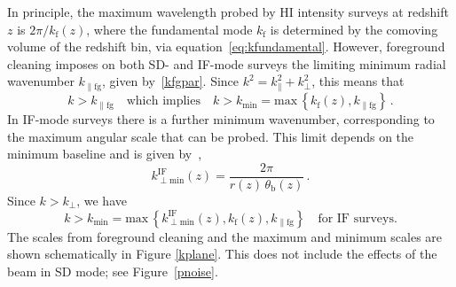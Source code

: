 In principle, the maximum wavelength probed by HI intensity surveys at redshift $z$ is $2\pi/k_\mathrm{f}(z)$, where the fundamental mode $k_\mathrm{f}$ is determined by the comoving volume of the redshift bin, via equation~\ref{eq:kfundamental}. 
However, foreground cleaning imposes on both SD- and IF-mode surveys the  limiting minimum radial wavenumber $k_{\|\mathrm{fg}}$, given by~\eqref{kfgpar}. Since $k^2=k_\|^2+k_\perp^2$, this means that  
\begin{equation} \label{eq:kmin}
k>k_{\|\mathrm{fg}} \quad \mbox{which implies}\quad k >  k_\mathrm{min}= \mathrm{max}\,\left\{ k_\mathrm{f}(z), k_{\|\mathrm{fg}} \right\}\,.
\end{equation}
In IF-mode surveys there is a further minimum wavenumber, corresponding to the maximum angular scale that can be probed. This limit depends on the minimum baseline and is given by~\cite{Bull:2014rha,Alonso:2017dgh,Karagiannis:2019jjx,Durrer:2020orn},
\begin{equation} \label{kifmin}
k_{\perp \mathrm{min}}^\mathrm{IF}(z) = \frac{2\pi}{r(z)\,\theta_\mathrm{b}(z)}\,.
\end{equation}
Since $k>k_\perp$, we have
\begin{equation} \label{kminif}
k > k_\mathrm{min} = \mathrm{max}\,\left\{ k_{\perp \mathrm{min}}^\mathrm{IF}(z), k_\mathrm{f}(z), k_{\|\mathrm{fg}} \right\} \quad \mbox{for IF surveys}.
\end{equation}
The scales from foreground cleaning and the maximum and minimum scales are shown schematically in Figure \ref{kplane}. This does not include the effects of the beam in SD mode; 
see Figure~\ref{pnoise}.
%
%
